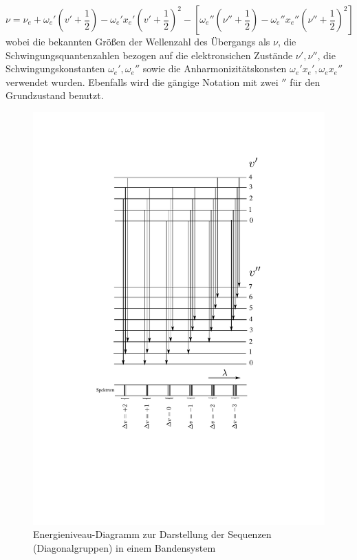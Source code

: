 \begin{equation}
\nu = \nu_e + \omega_e'(v'+\frac{1}{2}) - \omega_e'x_e'(v'+\frac{1}{2})^2 - [\omega_e'' (\nu''+\frac{1}{2})-\omega_e''x_e''(\nu''+\frac{1}{2})^2]
\end{equation}
wobei die bekannten Größen der Wellenzahl des Übergangs als $\nu$, die Schwingungsquantenzahlen bezogen auf die elektronsichen Zustände $\nu',\nu''$, die Schwingungskonstanten $\omega_e',\omega_e''$ sowie die Anharmonizitätskonsten $\omega_e'x_e',\omega_ex_e''$ verwendet wurden. Ebenfalls wird die gängige Notation mit zwei $''
$ für den Grundzustand benutzt. 
\begin{figure}[H]
	\centering	
	\begin{minipage}{0.6\textwidth}
		\includegraphics[width=\columnwidth]{Bilder/Bandensysteme.pdf}
		\caption{Energieniveau-Diagramm zur Darstellung der Sequenzen (Diagonalgruppen) in einem Bandensystem}
		\label{Bandensystem}
	\end{minipage}
\end{figure}

%
%
%
%
%
%